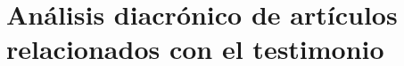 \section{Análisis diacrónico de artículos relacionados con el testimonio}






\setcounter{subsection}{1}


\setcounter{subsection}{2}


\setcounter{subsection}{3}


\setcounter{subsection}{4}


\setcounter{subsection}{5}


\setcounter{subsection}{6}

